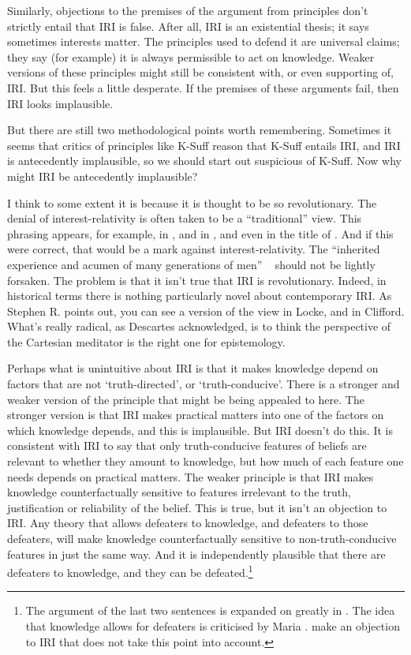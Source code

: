 \documentclass[11pt,oneside]{book}
\begin{document}
Similarly, objections to the premises of the argument from principles don't strictly entail that IRI is false. After all, IRI is an existential thesis; it says sometimes interests matter. The principles used to defend it are universal claims; they say (for example) it is always permissible to act on knowledge. Weaker versions of these principles might still be consistent with, or even supporting of, IRI. But this feels a little desperate. If the premises of these arguments fail, then IRI looks implausible.

But there are still two methodological points worth remembering. Sometimes it seems that critics of principles like K-Suff reason that K-Suff entails IRI, and IRI is antecedently implausible, so we should start out suspicious of K-Suff. Now why might IRI be antecedently implausible? 

I think to some extent it is because it is thought to be so revolutionary. The denial of interest-relativity is often taken to be a ``traditional'' view. This phrasing appears, for example, in  \citet{Boyd2015}, and in  \citet{IchikawaEtAl2012}, and even in the title of  \citet{Buckwalter2014}. And if this were correct, that would be a mark against interest-relativity. The ``inherited experience and acumen of many generations of men'' ~\citep[11]{Austin1956} should not be lightly forsaken. The problem is that it isn't true that IRI is revolutionary. Indeed, in historical terms there is nothing particularly novel about contemporary IRI. As Stephen R.  \citet{Grimm2015} points out, you can see a version of the view in Locke, and in Clifford. What's really radical, as Descartes acknowledged, is to think the perspective of the Cartesian meditator is the right one for epistemology.

Perhaps what is unintuitive about IRI is that it makes knowledge depend on factors that are not `truth-directed', or `truth-conducive'. There is a stronger and weaker version of the principle that might be being appealed to here. The stronger version is that IRI makes practical matters into one of the factors on which knowledge depends, and this is implausible. But IRI doesn't do this. It is consistent with IRI to say that only truth-conducive features of beliefs are relevant to whether they amount to knowledge, but how much of each feature one needs depends on practical matters. The weaker principle is that IRI makes knowledge counterfactually sensitive to features irrelevant to the truth, justification or reliability of the belief. This is true, but it isn't an objection to IRI. Any theory that allows defeaters to knowledge, and defeaters to those defeaters, will make knowledge counterfactually sensitive to non-truth-conducive features in just the same way. And it is independently plausible that there are defeaters to knowledge, and they can be defeated.\footnote{The argument of the last two sentences is expanded on greatly in  \citet[§3]{Weatherson2014-ProbScept}. The idea that knowledge allows for defeaters is criticised by Maria  \citet{Lasonen-Aarnio2014a}.  \citet{EatonPickavance2015} make an objection to IRI that does not take this point into account.}
\end{document}
